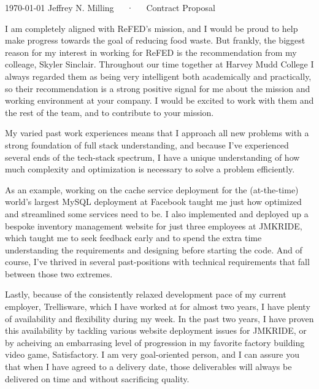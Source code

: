 \documentclass[11pt, a4paper]{awesome-cv-coverletter}
\begin{document}
\makecvheader[R]

\makecvfooter
  {\today}
  {Jeffrey N. Milling~~~·~~~Contract Proposal}
  {}

\makelettertitle

\begin{cvletter}

I am completely aligned with ReFED's mission, and I would be proud to help make
progress towards the goal of reducing food waste. But frankly, the biggest
reason for my interest in working for ReFED is the recommendation from my
colleage, Skyler Sinclair. Throughout our time together at Harvey Mudd College I
always regarded them as being very intelligent both academically and
practically, so their recommendation is a strong positive signal for me about
the mission and working environment at your company. I would be excited to work
with them and the rest of the team, and to contribute to your mission.

My varied past work experiences means that I approach all new problems with a
strong foundation of full stack understanding, and because I've experienced
several ends of the tech-stack spectrum, I have a unique understanding of
how much complexity and optimization is necessary to solve a problem efficiently. 

As an example, working on the cache service deployment for the (at-the-time)
world's largest MySQL deployment at Facebook taught me just how optimized and
streamlined some services need to be. I also implemented and deployed up a
bespoke inventory management website for just three employees at
JMKRIDE, which taught me to seek feedback early and to spend the extra time
understanding the requirements and designing before starting the code. And of
course, I've thrived in several past-positions with technical requirements that
fall between those two extremes.

Lastly, because of the consistently relaxed development pace of my current
employer, Trellisware, which I have worked at for almost two years, I have
plenty of availability and flexibility during my week. In the past two years, I
have proven this availability by tackling various website deployment issues for
JMKRIDE, or by acheiving an embarrasing level of progression in my favorite
factory building video game, Satisfactory. I am very goal-oriented
person, and I can assure you that when I have agreed to a delivery date, those
deliverables will always be delivered on time and without sacrificing quality.


\end{cvletter}
\end{document}
